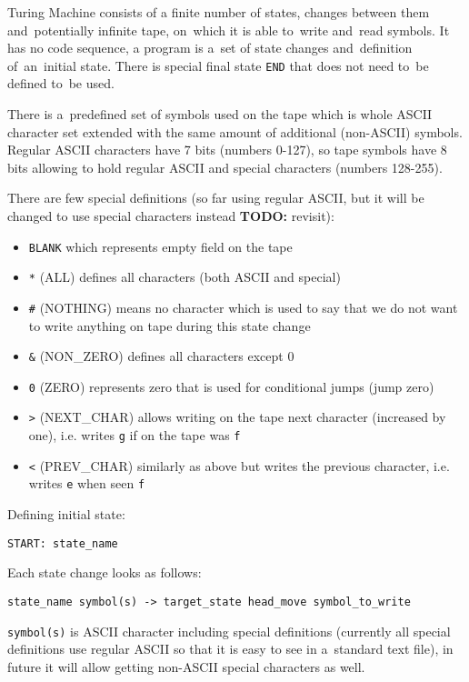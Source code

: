 \documentclass[english,shortabstract,mgr]{iithesis}
\newcommand{\todo}[1]{\textbf{TODO:} #1}
\begin{document}
Turing Machine consists of a finite number of states, changes between them
and~potentially infinite tape, on~which it is able to~write and~read symbols.
It has no code sequence, a program is a~set of state changes and~definition
of~an~initial state. There is special final state \texttt{END} that does not need
        to~be defined to~be used.

There is a~predefined set of symbols used on the tape which is whole ASCII character set
extended with the same amount of additional (non-ASCII) symbols. Regular
ASCII characters have 7 bits (numbers 0-127), so tape symbols have 8 bits
allowing to hold regular ASCII and special characters (numbers 128-255).

        There are few special definitions (so far using regular ASCII,
but it will be changed to use special characters instead \todo{revisit}):
\begin{itemize}
  \item \texttt{BLANK} which represents empty field on the tape
  \item \texttt{*} (ALL) defines all characters (both ASCII and special)
  \item \texttt{\#} (NOTHING) means no character which is used to say
                   that we do not want to write anything on tape during
                   this state change
          \item \texttt{\&} (NON\_ZERO) defines all characters except 0
          \item \texttt{0} (ZERO) represents zero that is used for conditional jumps
           (jump zero)
          \item \texttt{>} (NEXT\_CHAR) allows writing on the tape next character
                   (increased by one), i.e. writes \texttt{g} if on the tape
                   was \texttt{f}
  \item \texttt{<} (PREV\_CHAR) similarly as above but writes the previous character,
                   i.e. writes \texttt{e} when seen \texttt{f}
\end{itemize}

Defining initial state:
\begin{verbatim}
START: state_name
\end{verbatim}

Each state change looks as follows:
\begin{verbatim}
state_name symbol(s) -> target_state head_move symbol_to_write
\end{verbatim}

\texttt{symbol(s)} is ASCII character including special definitions (currently
all special definitions use regular ASCII so that it is easy to see
in a~standard text file), in future it will allow getting non-ASCII special
characters as well.
\end{document}
